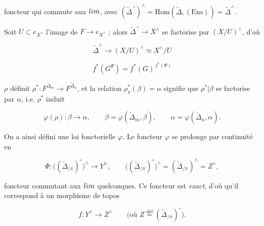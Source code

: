 \documentclass[11pt,a4paper]{article}
\begin{document}

foncteur qui commute aux $\varinjlim$, avec
$(\widetilde{\Delta}^{\,\circ})^{\wedge} = \mathrm{Hom}(\widetilde{\Delta},
(\mathrm{Ens})) = \widetilde{\Delta}^{\wedge}$.

Soit $U \subset e_{X^{\wedge}}$ l'image de $F \to e_{X^{\wedge}}$ ; alors
$\widetilde{\Delta}^{\,\circ} \longrightarrow X^{\wedge}$ se factorise par
$(X/U)^{\wedge}$, d'où

\[
  \widetilde{\Delta}^{\wedge} \longrightarrow (X/U)^{\wedge} \simeq X^{\wedge}/U
\]




\[
  f^{*}(G^{\Psi}) = f^{*}(G)^{\,f^{*}(\Psi)}
\]


$\rho$ définit $\rho^{*} : F^{\widetilde{\Delta}_{m}} \longrightarrow
F^{\widetilde{\Delta}_{n}}$, et la relation $\rho^{*}_{\pi}(\beta) = \alpha$
signifie que $\rho^{*}|\beta$ se factorise par $\alpha$, i.e. $\rho^{*}$ induit

\[
  \varphi(\rho) : \beta \longrightarrow \alpha,
  \qquad \beta = \varphi(\widetilde{\Delta}_{m}, \beta),
  \qquad \alpha = \varphi(\widetilde{\Delta}_{n}, \alpha).
\]


On a ainsi défini une loi fonctorielle $\varphi$. Le foncteur $\varphi$ se
prolonge par continuité en

\[
  \Phi : \bigl((\widetilde{\Delta}_{/\pi})^{\circ}\bigr)^{\wedge}
  \longrightarrow Y^{\wedge},
  \qquad
  \bigl((\widetilde{\Delta}_{/\pi})^{\circ}\bigr)^{\wedge}
  = (\widetilde{\Delta}_{/\pi})^{\wedge} = Z^{\wedge},
\]

foncteur commutant aux $\varinjlim$ quelconques. Ce foncteur est \emph{exact},
d'où qu'il correspond à un morphisme de topos

\[
  f : Y^{\wedge} \longrightarrow Z^{\wedge}
  \qquad \bigl(\text{où } Z \overset{\text{déf}}{=} (\widetilde{\Delta}_{/\pi})^{\circ}\bigr).
\]
\end{document}
